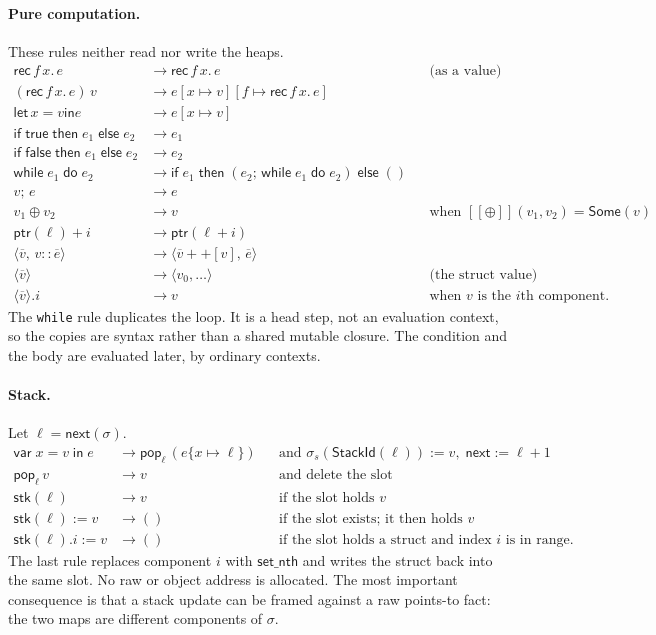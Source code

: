 \documentclass[11pt]{article}
\newcommand{\sem}[1]{[\![#1]\!]}
\newcommand{\step}{\longrightarrow}
\newcommand{\Some}{\mathsf{Some}}
\newcommand{\Unit}{\mathsf{()}}
\newcommand{\True}{\mathsf{true}}
\newcommand{\False}{\mathsf{false}}
\begin{document}
\paragraph{Pure computation.}
These rules neither read nor write the heaps.
\begin{align*}
\mathsf{rec}\,f\,x.\,e
  &\step
  \mathsf{rec}\,f\,x.\,e
  &&\text{(as a value)}\\
(\mathsf{rec}\,f\,x.\,e)\,v
  &\step
  e[x\mapsto v][f\mapsto \mathsf{rec}\,f\,x.\,e]\\
\mathsf{let}\,x = v \mathsf{ in } e
  &\step
  e[x\mapsto v]\\
\mathsf{if}\;\True\;\mathsf{then}\;e_1\;\mathsf{else}\;e_2
  &\step e_1\\
\mathsf{if}\;\False\;\mathsf{then}\;e_1\;\mathsf{else}\;e_2
  &\step e_2\\
\mathsf{while}\;e_1\;\mathsf{do}\;e_2
  &\step
  \mathsf{if}\;e_1\;\mathsf{then}\;(e_2;\,\mathsf{while}\;e_1\;\mathsf{do}\;e_2)\;\mathsf{else}\;\Unit\\
v;\,e &\step e\\
v_1 \oplus v_2 &\step v
  &&\text{when }\sem{\oplus}(v_1,v_2)=\Some(v)\\
\mathsf{ptr}(\ell)+i &\step \mathsf{ptr}(\ell+i)\\
\langle \overline{v},\, v::\overline{e}\rangle
  &\step
  \langle \overline{v}{+}{+}[v],\, \overline{e}\rangle\\
\langle \overline{v}\rangle
  &\step
  \langle v_0,\ldots\rangle
  &&\text{(the struct value)}\\
\langle \overline{v}\rangle.i &\step v
  &&\text{when }v\text{ is the }i\text{th component}.
\end{align*}
The \texttt{while} rule duplicates the loop.
It is a head step, not an evaluation context, so the copies are syntax rather than a shared mutable closure.
The condition and the body are evaluated later, by ordinary contexts.

\paragraph{Stack.}
Let \(\ell=\mathsf{next}(\sigma)\).
\begin{align*}
\mathsf{var}\;x = v\;\mathsf{in}\;e
  &\step
  \mathsf{pop}_{\ell}\,(e\{x\mapsto \ell\})
  &&\text{and }\sigma_{s}(\mathsf{StackId}(\ell)):=v,\;\mathsf{next}:=\ell+1\\
\mathsf{pop}_{\ell}\,v
  &\step
  v
  &&\text{and delete the slot}\\
\mathsf{stk}(\ell)
  &\step
  v
  &&\text{if the slot holds }v\\
\mathsf{stk}(\ell) := v
  &\step
  \Unit
  &&\text{if the slot exists; it then holds }v\\
\mathsf{stk}(\ell).i := v
  &\step
  \Unit
  &&\text{if the slot holds a struct and index }i\text{ is in range}.
\end{align*}
The last rule replaces component \(i\) with \(\mathsf{set\_nth}\) and writes the struct back into the same slot.
No raw or object address is allocated.
The most important consequence is that a stack update can be framed against a raw points-to fact: the two maps are different components of \(\sigma\).
\end{document}
